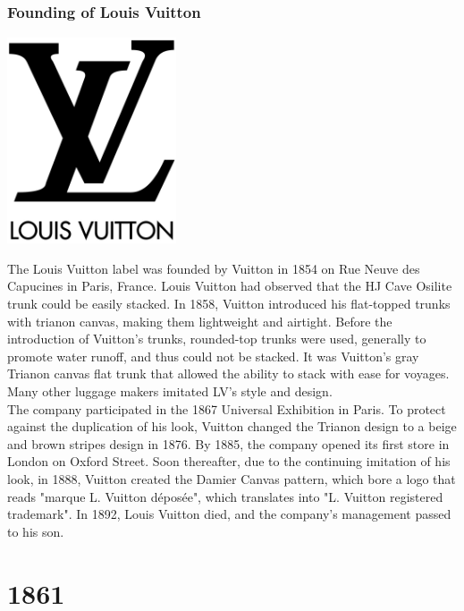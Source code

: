 \documentclass[11pt]{report}
\begin{document}
\section{}
\subsection{Founding of Louis Vuitton}
\vspace{2mm}\begin{center}\includegraphics[width=5cm]{./img/LouisVuittonLogo.jpg}\end{center}
The Louis Vuitton label was founded by Vuitton in 1854 on Rue Neuve des Capucines in Paris, France. Louis Vuitton had observed that the HJ Cave Osilite trunk could be easily stacked. In 1858, Vuitton introduced his flat-topped trunks with trianon canvas, making them lightweight and airtight. Before the introduction of Vuitton's trunks, rounded-top trunks were used, generally to promote water runoff, and thus could not be stacked. It was Vuitton's gray Trianon canvas flat trunk that allowed the ability to stack with ease for voyages. Many other luggage makers imitated LV's style and design.\\
The company participated in the 1867 Universal Exhibition in Paris. To protect against the duplication of his look, Vuitton changed the Trianon design to a beige and brown stripes design in 1876. By 1885, the company opened its first store in London on Oxford Street. Soon thereafter, due to the continuing imitation of his look, in 1888, Vuitton created the Damier Canvas pattern, which bore a logo that reads "marque L. Vuitton déposée", which translates into "L. Vuitton registered trademark". In 1892, Louis Vuitton died, and the company's management passed to his son.

\chapter{1861}
\end{document}
